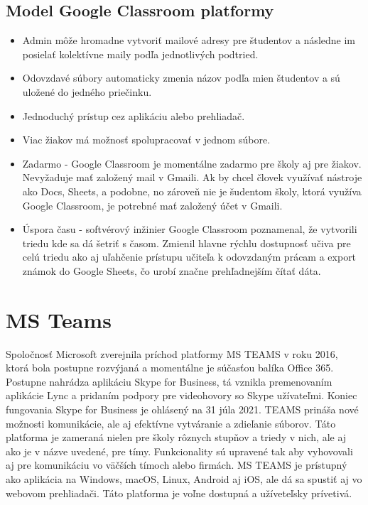 \documentclass[10pt,slovak,a4paper]{article}
\begin{document}
\subsection{Model Google Classroom platformy} \label{Google Classroom: Google Classroom platforma}

\begin{itemize}
	\item Admin môže hromadne vytvoriť mailové adresy pre študentov a následne im posielať kolektívne maily podľa jednotlivých podtried. 
	\item Odovzdavé súbory automaticky zmenia názov podľa mien študentov a sú uložené do jedného priečinku.
	\item Jednoduchý prístup cez aplikáciu alebo prehliadač.
	\item Viac žiakov má možnosť spolupracovať v jednom súbore.
	\item Zadarmo -
Google Classroom je momentálne zadarmo pre školy aj pre žiakov. Nevyžaduje mať založený mail v Gmaili. Ak by chcel človek využívať nástroje ako Docs, Sheets, a podobne, no zároveň nie je šudentom školy, ktorá využíva Google Classroom, je potrebné mať založený účet v Gmaili. 
	\item Úspora času - softvérový inžinier Google Classroom poznamenal, že vytvorili triedu kde sa dá šetriť s časom. Zmienil hlavne rýchlu dostupnosť učiva pre celú triedu ako aj uľahčenie prístupu učiteľa k odovzdaným prácam a export známok do Google Sheets, čo urobí značne prehľadnejším čítať dáta. \cite {GoogleClassroomPBL}
	\end{itemize}


\section{MS Teams} \label{MS Teams}
Spoločnosť Microsoft zverejnila príchod platformy MS TEAMS v roku 2016, ktorá bola postupne rozvýjaná a momentálne je súčasťou balíka Office 365. Postupne nahrádza aplikáciu Skype for Business, tá vznikla premenovaním aplikácie Lync a pridaním podpory pre videohovory so Skype užívateľmi. Koniec fungovania Skype for Business je ohlásený na 31 júla 2021. \cite{ohlasene_ukoncenie} TEAMS prináša nové možnosti komunikácie, ale aj efektívne vytváranie a zdieľanie súborov. Táto platforma je zameraná nielen pre školy rôznych stupňov a triedy v nich, ale aj ako je v názve uvedené, pre tímy. Funkcionality sú upravené tak aby vyhovovali aj pre komunikáciu vo väčších tímoch alebo firmách. MS TEAMS je prístupný ako aplikácia na Windows, macOS, Linux, Android aj iOS, ale dá sa spustiť aj vo webovom prehliadači. Táto platforma je voľne dostupná a užíveteľsky prívetivá. \cite {MS-TEAMS}
\end{document}
